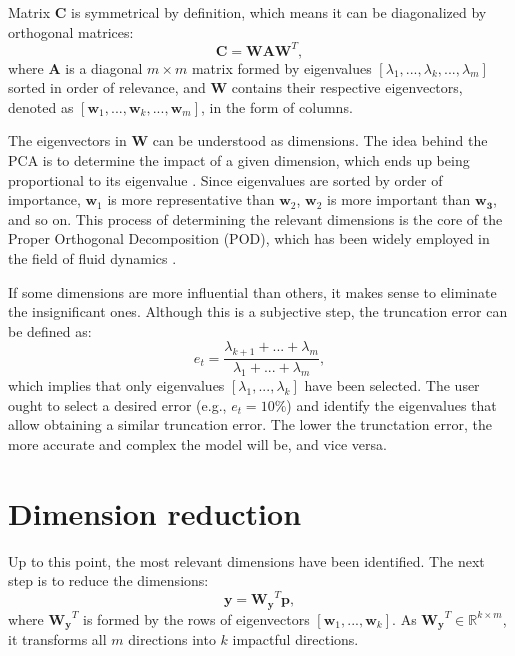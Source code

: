 Matrix $\mathbf{C}$ is symmetrical by definition, which means it can be diagonalized by orthogonal matrices:
\begin{equation}
  \mathbf{C} = \mathbf{W}\mathbf{A}\mathbf{W}^T,
  \label{eq:C2}
\end{equation}
where $\mathbf{A}$ is a diagonal $m\times m$ matrix formed by eigenvalues $[\lambda_1,...,\lambda_k,...,\lambda_m]$ sorted in order of relevance, and $\mathbf{W}$ contains their respective eigenvectors, denoted as $[\mathbf{w}_1, ..., \mathbf{w}_k, ..., \mathbf{w}_m]$, in the form of columns. 

The eigenvectors in $\mathbf{W}$ can be understood as dimensions. The idea behind the PCA is to determine the impact of a given dimension, which ends up being proportional to its eigenvalue \cite{shen2020}. Since eigenvalues are sorted by order of importance, $\mathbf{w}_1$ is more representative than $\mathbf{w}_2$, $\mathbf{w}_2$ is more important than $\mathbf{w_3}$, and so on. This process of determining the relevant dimensions is the core of the Proper Orthogonal Decomposition (POD), which has been widely employed in the field of fluid dynamics \cite{berkooz1993, weiss2019}. 

If some dimensions are more influential than others, it makes sense to eliminate the insignificant ones. Although this is a subjective step, the truncation error can be defined as:
\begin{equation}
  e_t = \frac{\lambda_{k+1} + ... + \lambda_{m}}{\lambda_1 + ... + \lambda_m},
  \label{eq:err1}
\end{equation}
which implies that only eigenvalues $[\lambda_1,..., \lambda_k]$ have been selected. The user ought to select a desired error (e.g., $e_t=10\%$) and identify the eigenvalues that allow obtaining a similar truncation error. The lower the trunctation error, the more accurate and complex the model will be, and vice versa. 

\section{Dimension reduction}
Up to this point, the most relevant dimensions have been identified. The next step is to reduce the dimensions:
\begin{equation}
  \mathbf{y} = \mathbf{W_y}^T \mathbf{p},
  \label{eq:y1}
\end{equation}
where $\mathbf{W_y}^T$ is formed by the rows of eigenvectors $[\mathbf{w}_1, ..., \mathbf{w}_k]$. As $\mathbf{W_y}^T \in \mathbb{R}^{k \times m}$, it transforms all $m$ directions into $k$ impactful directions. 

